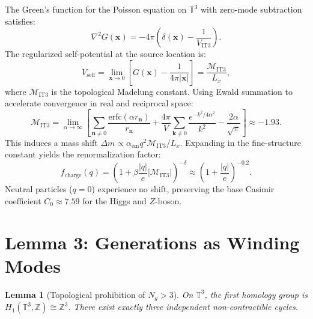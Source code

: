 \documentclass[12pt,a4paper]{article}
\newtheorem{lemma}{Lemma}
\begin{document}
The Green's function for the Poisson equation on $\mathbb{T}^3$ with zero-mode subtraction satisfies:
\begin{equation}
    \nabla^2 G(\mathbf{x}) = -4\pi \left( \delta(\mathbf{x}) - \frac{1}{V_{\text{IT3}}} \right).
\end{equation}
The regularized self-potential at the source location is:
\begin{equation}
    V_{\text{self}} = \lim_{\mathbf{x}\to 0} \left[ G(\mathbf{x}) - \frac{1}{4\pi|\mathbf{x}|} \right] = \frac{\mathcal{M}_{\text{IT3}}}{L_x},
\end{equation}
where $\mathcal{M}_{\text{IT3}}$ is the topological Madelung constant. Using Ewald summation to accelerate convergence in real and reciprocal space:
\begin{equation}
    \mathcal{M}_{\text{IT3}} = \lim_{\alpha\to\infty} \left[ \sum_{\mathbf{n}\neq 0} \frac{\text{erfc}(\alpha r_{\mathbf{n}})}{r_{\mathbf{n}}} + \frac{4\pi}{V} \sum_{\mathbf{k}\neq 0} \frac{e^{-k^2/4\alpha^2}}{k^2} - \frac{2\alpha}{\sqrt{\pi}} \right] \approx -1.93.
\end{equation}
This induces a mass shift $\Delta m \propto \alpha_{\text{em}} q^2 \mathcal{M}_{\text{IT3}}/L_x$. Expanding in the fine-structure constant yields the renormalization factor:
\begin{equation}
    f_{\text{charge}}(q) = \left( 1 + \beta \frac{|q|}{e} |\mathcal{M}_{\text{IT3}}| \right)^{-\delta} \approx \left( 1 + \frac{|q|}{e} \right)^{-0.2}.
\end{equation}
Neutral particles ($q=0$) experience no shift, preserving the base Casimir coefficient $C_0 \approx 7.59$ for the Higgs and $Z$-boson.

\section{Lemma 3: Generations as Winding Modes}
\begin{lemma}[Topological prohibition of $N_g > 3$]
On $\mathbb{T}^3$, the first homology group is $H_1(\mathbb{T}^3,\mathbb{Z}) \cong \mathbb{Z}^3$. There exist exactly three independent non-contractible cycles.
\end{lemma}
\end{document}
